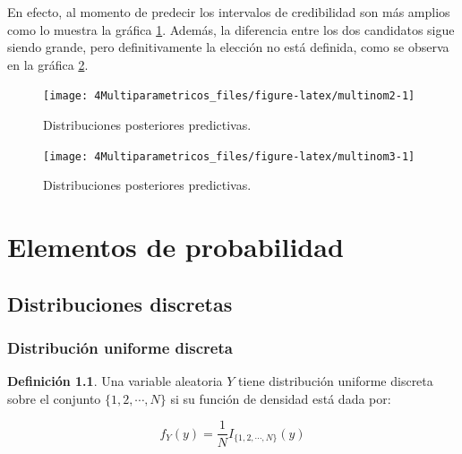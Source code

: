 \documentclass[
  10pt,
  spanish,
]{book}
\theoremstyle{definition}
\newtheorem{definition}{Definición}[chapter]
\theoremstyle{definition}
\theoremstyle{definition}
\theoremstyle{definition}
\theoremstyle{remark}
\begin{document}
En efecto, al momento de predecir los intervalos de credibilidad son más amplios como lo muestra la gráfica \ref{fig:multinom2}. Además, la diferencia entre los dos candidatos sigue siendo grande, pero definitivamente la elección no está definida, como se observa en la gráfica \ref{fig:multinom3}.

\begin{figure}

{\centering \texttt{[image: 4Multiparametricos\_files/figure-latex/multinom2-1]} 

}

\caption{Distribuciones posteriores predictivas.}\label{fig:multinom2}
\end{figure}

\begin{figure}

{\centering \texttt{[image: 4Multiparametricos\_files/figure-latex/multinom3-1]} 

}

\caption{Distribuciones posteriores predictivas.}\label{fig:multinom3}
\end{figure}

\hypertarget{appendix-apuxe9ndice}{%
\appendix}


\hypertarget{elementos-de-probabilidad}{%
\chapter{Elementos de probabilidad}\label{elementos-de-probabilidad}}

\hypertarget{distribuciones-discretas}{%
\section{Distribuciones discretas}\label{distribuciones-discretas}}

\hypertarget{distribuciuxf3n-uniforme-discreta}{%
\subsection{Distribución uniforme discreta}\label{distribuciuxf3n-uniforme-discreta}}

\begin{definition}
\protect\hypertarget{def:unnamed-chunk-1}{}{\label{def:unnamed-chunk-1} }Una variable aleatoria \(Y\) tiene distribución uniforme discreta sobre el conjunto \(\{1,2,\cdots,N\}\) si su función de densidad está dada por:

\begin{equation}
f_Y(y)=\frac{1}{N}I_{\{1,2,\cdots,N\}}(y)
\end{equation}
\end{definition}
\end{document}
